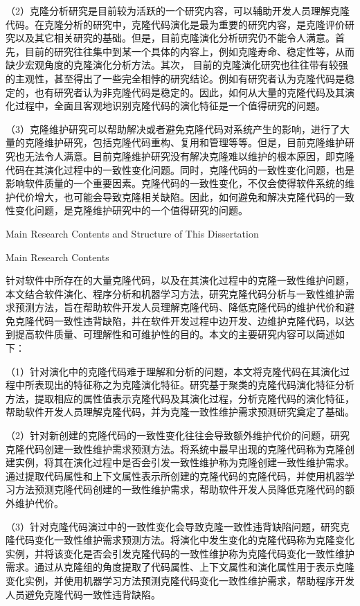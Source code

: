 （2）克隆分析研究是目前较为活跃的一个研究内容，可以辅助开发人员理解克隆代码。在克隆分析的研究中，克隆代码演化是最为重要的研究内容，是克隆评价研究以及其它相关研究的基础。但是，目前克隆演化分析研究仍不能令人满意。首先，目前的研究往往集中到某一个具体的内容上，例如克隆寿命、稳定性等，从而缺少宏观角度的克隆演化分析方法。其次， 目前的克隆演化研究也往往带有较强的主观性，甚至得出了一些完全相悖的研究结论。例如有研究者认为克隆代码是稳定的，也有研究者认为非克隆代码是稳定的。因此，如何从大量的克隆代码及其演化过程中，全面且客观地识别克隆代码的演化特征是一个值得研究的问题。

（3）克隆维护研究可以帮助解决或者避免克隆代码对系统产生的影响，进行了大量的克隆维护研究，包括克隆代码重构、复用和管理等等。但是，目前克隆维护研究也无法令人满意。目前克隆维护研究没有解决克隆难以维护的根本原因，即克隆代码在其演化过程中的一致性变化问题。同时，克隆代码的一致性变化问题，也是影响软件质量的一个重要因素。克隆代码的一致性变化，不仅会使得软件系统的维护代价增大，也可能会导致克隆相关缺陷。因此，如何避免和解决克隆代码的一致性变化问题，是克隆维护研究中的一个值得研究的问题。

{Main Research Contents and Structure of This Dissertation}

{Main Research Contents}

针对软件中所存在的大量克隆代码，以及在其演化过程中的克隆一致性维护问题，本文结合软件演化、程序分析和机器学习方法，研究克隆代码分析与一致性维护需求预测方法，旨在帮助软件开发人员理解克隆代码、降低克隆代码的维护代价和避免克隆代码一致性违背缺陷，并在软件开发过程中边开发、边维护克隆代码，以达到提高软件质量、可理解性和可维护性的目的。本文的主要研究内容可以简述如下：

（1）针对演化中的克隆代码难于理解和分析的问题，本文将克隆代码在其演化过程中所表现出的特征称之为克隆演化特征。研究基于聚类的克隆代码演化特征分析方法，提取相应的属性值表示克隆代码及其演化过程，分析克隆代码的演化特征，帮助软件开发人员理解克隆代码，并为克隆一致性维护需求预测研究奠定了基础。

（2）针对新创建的克隆代码的一致性变化往往会导致额外维护代价的问题，研究克隆代码创建一致性维护需求预测方法。将系统中最早出现的克隆代码称为克隆创建实例，将其在演化过程中是否会引发一致性维护称为克隆创建一致性维护需求。通过提取代码属性和上下文属性表示所创建的克隆代码的克隆代码，并使用机器学习方法预测克隆代码创建的一致性维护需求，帮助软件开发人员降低克隆代码的额外维护代价。

（3）针对克隆代码演过中的一致性变化会导致克隆一致性违背缺陷问题，研究克隆代码变化一致性维护需求预测方法。将演化中发生变化的克隆代码称为克隆变化实例，并将该变化是否会引发克隆代码的一致性维护称为克隆代码变化一致性维护需求。通过从克隆组的角度提取了代码属性、上下文属性和演化属性用于表示克隆变化实例，并使用机器学习方法预测克隆代码变化一致性维护需求，帮助程序开发人员避免克隆代码一致性违背缺陷。

